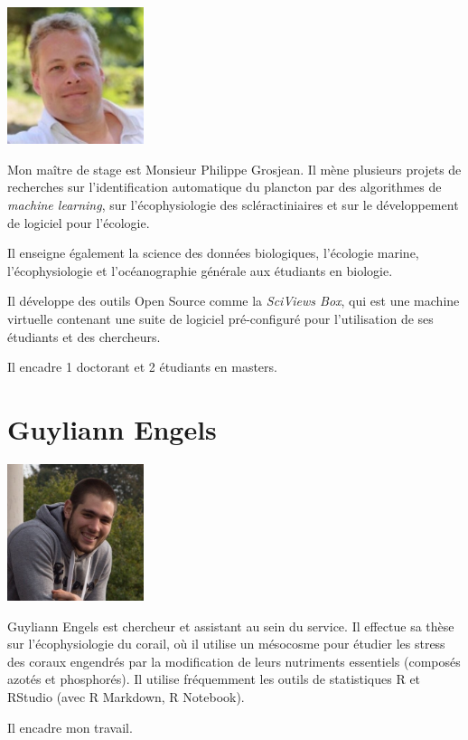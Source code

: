 \documentclass[]{report}
\begin{document}
\includegraphics[width=4.00000cm]{../image/Grosjean2.jpg}

Mon maître de stage est Monsieur Philippe Grosjean. Il mène plusieurs
projets de recherches sur l'identification automatique du plancton par
des algorithmes de \emph{machine learning}, sur l'écophysiologie des
scléractiniaires et sur le développement de logiciel pour l'écologie.

Il enseigne également la science des données biologiques, l'écologie
marine, l'écophysiologie et l'océanographie générale aux étudiants en
biologie.

Il développe des outils Open Source comme la \emph{SciViews Box}, qui
est une machine virtuelle contenant une suite de logiciel pré-configuré
pour l'utilisation de ses étudiants et des chercheurs.

Il encadre 1 doctorant et 2 étudiants en masters.

\section{Guyliann Engels}\label{guyliann-engels}

\includegraphics[width=4.00000cm]{../image/Guyliann.jpg}

Guyliann Engels est chercheur et assistant au sein du service. Il
effectue sa thèse sur l'écophysiologie du corail, où il utilise un
mésocosme pour étudier les stress des coraux engendrés par la
modification de leurs nutriments essentiels (composés azotés et
phosphorés). Il utilise fréquemment les outils de statistiques R et
RStudio (avec R Markdown, R Notebook).

Il encadre mon travail.
\end{document}
